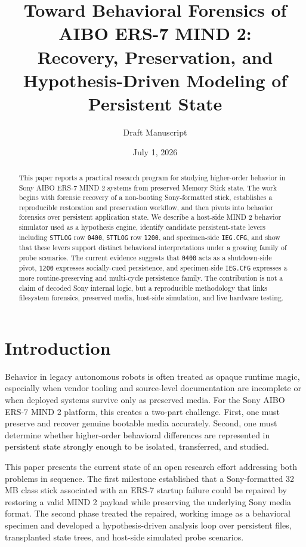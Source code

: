 \documentclass[11pt]{article}
\title{Toward Behavioral Forensics of AIBO ERS-7 MIND 2:\\
Recovery, Preservation, and Hypothesis-Driven Modeling of Persistent State}
\author{Draft Manuscript}
\date{July 1, 2026}
\begin{document}
\maketitle

\begin{abstract}
This paper reports a practical research program for studying higher-order
behavior in Sony AIBO ERS-7 MIND 2 systems from preserved Memory Stick state.
The work begins with forensic recovery of a non-booting Sony-formatted stick,
establishes a reproducible restoration and preservation workflow, and then
pivots into behavior forensics over persistent application state. We describe a
host-side MIND 2 behavior simulator used as a hypothesis engine, identify
candidate persistent-state levers including \texttt{STTLOG} row \texttt{0400},
\texttt{STTLOG} row \texttt{1200}, and specimen-side \texttt{IEG.CFG}, and
show that these levers support distinct behavioral interpretations under a
growing family of probe scenarios. The current evidence suggests that
\texttt{0400} acts as a shutdown-side pivot, \texttt{1200} expresses
socially-cued persistence, and specimen-side \texttt{IEG.CFG} expresses a more
routine-preserving and multi-cycle persistence family. The contribution is not
a claim of decoded Sony internal logic, but a reproducible methodology that
links filesystem forensics, preserved media, host-side simulation, and live
hardware testing.
\end{abstract}

\section{Introduction}
Behavior in legacy autonomous robots is often treated as opaque runtime magic,
especially when vendor tooling and source-level documentation are incomplete or
when deployed systems survive only as preserved media. For the Sony AIBO ERS-7
MIND 2 platform, this creates a two-part challenge. First, one must preserve
and recover genuine bootable media accurately. Second, one must determine
whether higher-order behavioral differences are represented in persistent state
strongly enough to be isolated, transferred, and studied.

This paper presents the current state of an open research effort addressing
both problems in sequence. The first milestone established that a Sony-formatted
32 MB class stick associated with an ERS-7 startup failure could be repaired by
restoring a valid MIND 2 payload while preserving the underlying Sony media
format. The second phase treated the repaired, working image as a behavioral
specimen and developed a hypothesis-driven analysis loop over persistent files,
transplanted state trees, and host-side simulated probe scenarios.
\end{document}
